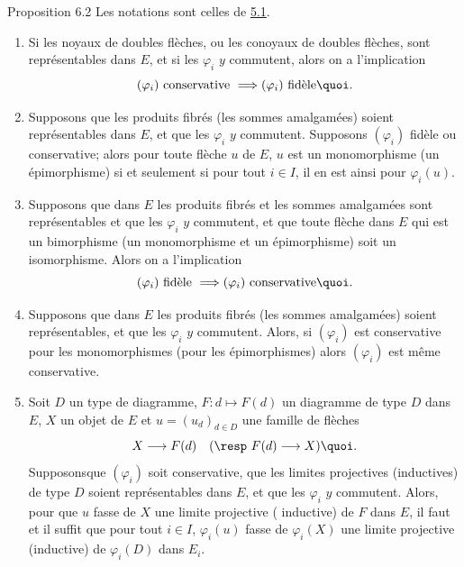 \begin{enonce*}{Proposition 6.2}
Les notations sont celles de \hyperref[I.prop5.1]{5.1}.
\begin{enumerate}
\renewcommand{\theenumi}{\roman{enumi}}
\renewcommand{\labelenumi}{(\theenumi)}
\item Si les noyaux de doubles flèches, ou les conoyaux de doubles
  flèches, sont représentables dans $E$, et si les $\varphi_i$ $y$
  commutent, alors on a l'implication
$$
(\varphi_i)\mbox{ conservative } \Longrightarrow (\varphi_i)\mbox{
    fidèle}{\quoi}.
$$

\item Supposons que les produits fibrés (\resp  les sommes
  amalgamées) soient représentables dans $E$, et que les
  $\varphi_i$ $y$ commutent. Supposons $(\varphi_i)$ fidèle ou
  conservative; alors pour toute flèche $u$ de $E$, $u$ est un
  monomorphisme (\resp  un épimorphisme) si et seulement si pour tout
  $i\in I$, il en est ainsi pour $\varphi_i(u)$.

\item Supposons que dans $E$ les produits fibrés et les sommes
  amalgamées sont représentables et que les $\varphi_i$ $y$
  commutent, et que toute flèche dans $E$ qui est un bimorphisme
  (\ie un monomorphisme et un épimorphisme) soit un
  isomorphisme. Alors on a l'implication
$$
(\varphi_i)\mbox{ fidèle } \Longrightarrow (\varphi_i)\mbox{
    conservative}{\quoi}.
$$

\item Supposons que dans $E$ les produits fibrés (\resp  les sommes
  amalgamées) soient représentables, et que les $\varphi_i$ $y$
  commutent. Alors, si $(\varphi_i)$ est conservative pour les
  monomorphismes (\resp  pour les épimorphismes) alors $(\varphi_i)$
  est même conservative.

\item Soit $D$ un type de diagramme, $F:d\mapsto F(d)$ un diagramme de
  type $D$ dans $E$, $X$ un objet de $E$ et $u=(u_d)_{d\in D}$ une
  famille de flèches
$$
X\longrightarrow F(d)\quad (\mbox{\resp  } F(d)\longrightarrow
X){\quoi}.
$$
Supposons\pageoriginale que $(\varphi_i)$ soit conservative, que les
limites projectives (\resp  inductives) de type $D$ soient
représentables dans $E$, et que les $\varphi_i$ $y$ commutent.
Alors, pour que $u$ fasse de $X$ une limite projective (\resp
inductive) de $F$ dans $E$, il faut et il suffit que pour tout $i\in
I$, $\varphi_i(u)$ fasse de $\varphi_i(X)$ une limite projective
(\resp  inductive) de $\varphi_i(D)$ dans $E_i$.
\end{enumerate}
\end{enonce*}

